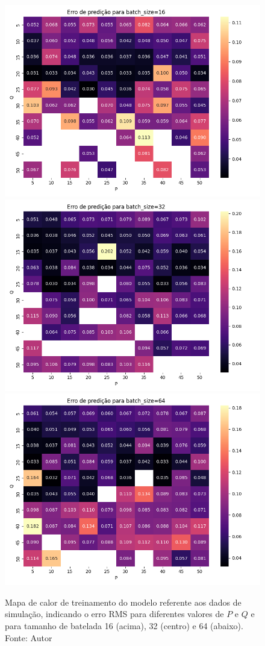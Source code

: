 \begin{figure}[hbt!]
    \centering
    \includegraphics[width=0.7\linewidth]{Imagens/chap04/simulation_hp_metrics_16.png}
    \hfill
    \includegraphics[width=0.7\linewidth]{Imagens/chap04/simulation_hp_metrics_32.png}
    \hfill
    \includegraphics[width=0.7\linewidth]{Imagens/chap04/simulation_hp_metrics_64.png}
    \caption{Mapa de calor de treinamento do modelo referente aos dados de simulação, indicando o erro RMS para diferentes valores de $P$ e $Q$ e para tamanho de batelada 16 (acima), 32 (centro) e 64 (abaixo). Fonte: Autor}
    \label{fig:sim_hp_metrics}
\end{figure}


